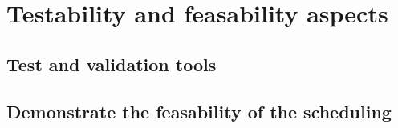 
\chapter{Testability and feasability aspects}

\section{Test and validation tools}

\section{Demonstrate the feasability of the scheduling}

